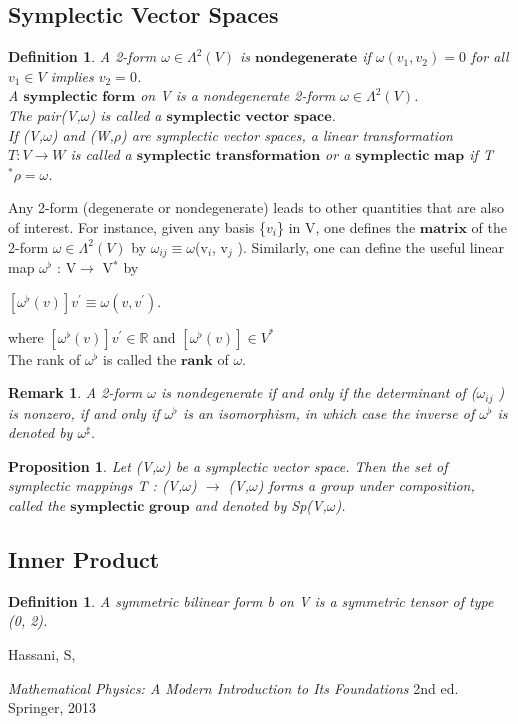 \documentclass[12pt,a4paper]{article}
\newtheorem{rem}[thm]{Remark}
\newtheorem{defn}[thm]{Definition}
\newtheorem{prop}{Proposition}
\begin{document}
\subsection{Symplectic Vector Spaces}

\begin{defn}
A 2-form $\omega \in \Lambda^{2}(V)$ is $\textbf{nondegenerate}$ if $\omega(v_1, v_2) = 0$ for all $v_1 \in V$ implies $v_2 = 0$. \\A $\textbf{symplectic form}$ on V is a nondegenerate
2-form $\omega \in \Lambda^{2}(V)$. \\The pair(V,$\omega$) is called a $\textbf{symplectic vector space}$.\\
If (V,$\omega$) and (W,$\rho$) are symplectic vector spaces, a linear transformation $T:V \to W$ is called a $\textbf{symplectic transformation}$ or a $\textbf{symplectic map}$ if T$^* \rho = \omega$.
\end{defn}

Any 2-form (degenerate or nondegenerate) leads to other quantities that
are also of interest. For instance, given any basis \{$v_i$\} in V, one defines the
$\textbf{matrix}$ of the 2-form $\omega \in \Lambda^{2}(V)$ by $\omega_{ij} \equiv \omega$(v$_i$, v$_j$ ). Similarly, one can
define the useful linear map $\omega^{\flat}$ : V$\to$ V$^*$ by
\begin{center}
$ [ \omega^{\flat} (v) ] v^{'} \equiv \omega(v, v^{'})$.
\end{center}
\indent where $ [ \omega^{\flat} (v) ] v^{'} \in \mathbb{R}$ and  $ [ \omega^{\flat} (v) ] \in V^{*}$\\
The rank of $\omega^{\flat}$ is called the $\textbf{rank}$ of $\omega$.
\begin{rem}
A 2-form $\omega$ is nondegenerate if and only if the determinant of ($\omega_{ij}$ ) is nonzero, if and only if $\omega^{\flat}$ is an isomorphism, in which
case the inverse of $\omega^{\flat}$ is denoted by $\omega^{\sharp}$.
\end{rem}
\begin{prop}
Let (V,$\omega$) be a symplectic vector space. Then the set of
symplectic mappings T : (V,$\omega$) $\to$ (V,$\omega$) forms a group under composition,
called the $\textbf{symplectic group}$ and denoted by Sp(V,$\omega$).
\end{prop}
\subsection{Inner Product}
\begin{defn}
A symmetric bilinear form b on V is a symmetric tensor of type (0, 2).
\end{defn}





\newpage
\begin{thebibliography}{9}

  Hassani, S,

  \emph{Mathematical Physics: A Modern Introduction to Its Foundations}  2nd ed. Springer, 2013



\end{thebibliography}
\end{document}
